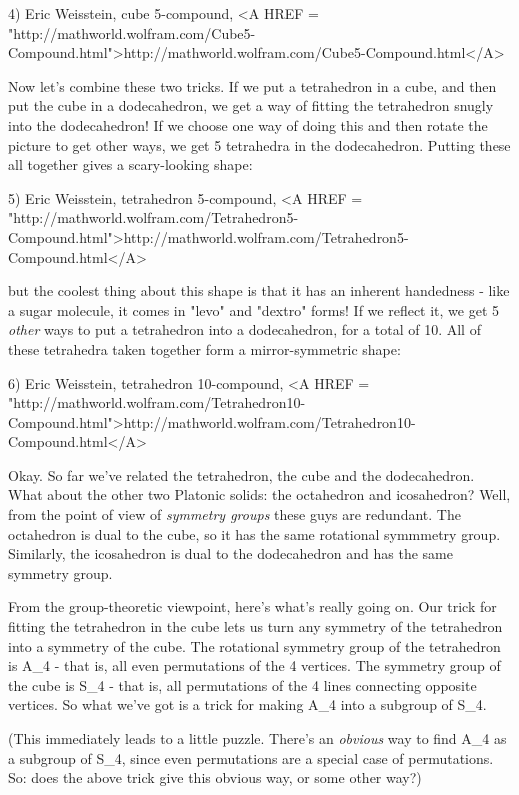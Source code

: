 4) Eric Weisstein, cube 5-compound, 
<A HREF = "http://mathworld.wolfram.com/Cube5-Compound.html">http://mathworld.wolfram.com/Cube5-Compound.html</A>

Now let's combine these two tricks.  If we put a tetrahedron in a cube,
and then put the cube in a dodecahedron, we get a way of fitting the
tetrahedron snugly into the dodecahedron!  If we choose one way of doing
this and then rotate the picture to get other ways, we get 5 tetrahedra
in the dodecahedron.  Putting these all together gives a scary-looking
shape:

5) Eric Weisstein, tetrahedron 5-compound, 
<A HREF = "http://mathworld.wolfram.com/Tetrahedron5-Compound.html">http://mathworld.wolfram.com/Tetrahedron5-Compound.html</A>

but the coolest thing about this shape is that it has an inherent
handedness - like a sugar molecule, it comes in "levo" and
"dextro" forms!  If we reflect it, we get 5 \emph{other} ways to
put a tetrahedron into a dodecahedron, for a total of 10.  All of these
tetrahedra taken together form a mirror-symmetric shape:

6) Eric Weisstein, tetrahedron 10-compound, 
<A HREF = "http://mathworld.wolfram.com/Tetrahedron10-Compound.html">http://mathworld.wolfram.com/Tetrahedron10-Compound.html</A>

Okay.  So far we've related the tetrahedron, the cube and the dodecahedron.  
What about the other two Platonic solids: the octahedron and icosahedron?  
Well, from the point of view of \emph{symmetry groups} these guys are
redundant.  The octahedron is dual to the cube, so it has the same
rotational symmmetry group. Similarly, the icosahedron is dual to the
dodecahedron and has the same symmetry group.

From the group-theoretic viewpoint, here's what's really going on.  Our
trick for fitting the tetrahedron in the cube lets us turn any symmetry
of the tetrahedron into a symmetry of the cube.  The rotational symmetry
group of the tetrahedron is A_{4} - that is, all even
permutations of the 4 vertices.  The symmetry group of the cube is
S_{4} - that is, all permutations of the 4 lines connecting
opposite vertices.  So what we've got is a trick for making
A_{4} into a subgroup of S_{4}. 

(This immediately leads to a little puzzle.  There's an \emph{obvious} way
to find A_{4} as a subgroup of S_{4}, since even 
permutations are a special
case of permutations.   So: does the above trick give this obvious way,
or some other way?)

